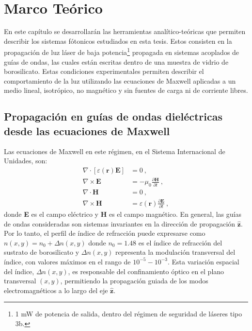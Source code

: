 \chapter{Marco Teórico \label{cap:teo}}

En este capítulo se desarrollarán las herramientas analítico-teóricas que permiten describir los sistemas fótonicos estudiados en esta tesis. Estos consisten en la propagación de luz láser de baja potencia\footnote{1 mW de potencia de salida, dentro del régimen de seguridad de láseres tipo 3b.} propagada en sistemas acoplados de guías de ondas, las cuales están escritas dentro de una muestra de vidrio de borosilicato. Estas condiciones experimentales permiten describir el comportamiento de la luz utilizando las ecuaciones de Maxwell aplicadas a un medio lineal, isotrópico, no magnético y sin fuentes de carga ni de corriente libres. 
\section{Propagación en guías de ondas dieléctricas desde las ecuaciones de Maxwell \label{cap:maxwell}}

Las ecuaciones de Maxwell en este régimen, en el Sistema Internacional de Unidades, son:
\begin{align}
	\nabla\cdot\left[\varepsilon(\textbf{r})\textbf{E}\right] &= 0 \ , \label{eqn:gauss}
	\\	
	\nabla\times\textbf{E} &= -\mu_0 \frac{\partial \textbf{H}}{\partial t} \ , \label{eqn:faraday-lenz}
	\\	
	\nabla\cdot\textbf{H} &= 0 \ , \label{eqn:div0}
	\\	
	\nabla\times\textbf{H} &=\varepsilon(\textbf{r}) \frac{\partial \textbf{E}}{\partial t} \ , \label{eqn:ampere-maxwell}
\end{align}
donde \textbf{E} es el campo eléctrico y \textbf{H} es el campo magnético. En general, las guías de ondas consideradas son sistemas invariantes en la dirección de propagación $\hat{\textbf{z}}$. Por lo tanto, el perfil de índice de refracción puede expresarse como $n(x,y) = n_0 + \Delta n(x,y)$ donde $n_0 = 1.48$ es el índice de refracción del sustrato de borosilicato y $\Delta n(x,y)$ representa la modulación transversal del índice, con valores máximos en el rango de $10^{-5} - 10^{-3}$. Esta variación espacial del índice, $\Delta n(x,y)$, es responsable del confinamiento óptico en el plano transversal $(x,y)$, permitiendo la propagación guiada de los modos electromagnéticos a lo largo del eje $\hat{\textbf{z}}$. 

